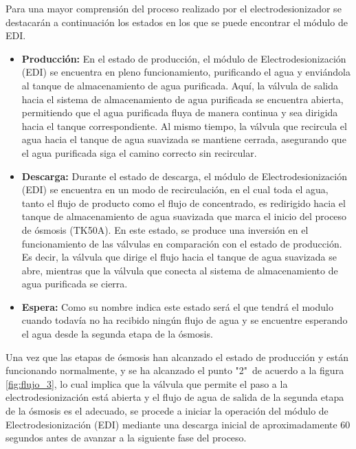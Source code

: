 
Para una mayor comprensión del proceso realizado por el electrodesionizador se destacarán a continuación
los estados en los que se puede encontrar el módulo de EDI.
\begin{itemize}
    \item \textbf{Producción: }En el estado de producción, el módulo de Electrodesionización (EDI) se encuentra en
          pleno funcionamiento, purificando el agua y enviándola al tanque de almacenamiento de agua purificada.
          Aquí, la válvula de salida hacia el sistema de almacenamiento de agua purificada se encuentra
          abierta, permitiendo que el agua purificada fluya de manera continua y sea dirigida hacia el tanque
          correspondiente. Al mismo tiempo, la válvula que recircula el agua hacia el tanque de agua suavizada se
          mantiene cerrada, asegurando que el agua purificada siga el camino correcto sin recircular.
    \item \textbf{Descarga: }Durante el estado de descarga, el módulo de Electrodesionización (EDI) se encuentra en
          un modo de recirculación, en el cual toda el agua, tanto el flujo de producto como el flujo de concentrado, es
          redirigido hacia el tanque de almacenamiento de agua suavizada que marca el inicio del proceso de ósmosis (TK50A).
          En este estado, se produce una inversión en el funcionamiento de las válvulas en comparación con el estado de producción.
          Es decir, la válvula que dirige el flujo hacia el tanque de agua suavizada se abre, mientras que la válvula que conecta al
          sistema de almacenamiento de agua purificada se cierra.
    \item \textbf{Espera: }Como su nombre indica este estado será el que tendrá el modulo cuando todavía no ha recibido ningún flujo de agua
          y se encuentre esperando el agua desde la segunda etapa de la ósmosis.
\end{itemize}
Una vez que las etapas de ósmosis han alcanzado el estado de producción y están funcionando normalmente, y
se ha alcanzado el punto "2"\ de acuerdo a la figura \ref{fig:flujo_3}, lo cual implica que la válvula que permite el paso a
la electrodesionización está abierta y el flujo de agua de salida de la segunda etapa de la ósmosis es el
adecuado, se procede a iniciar la operación del módulo de Electrodesionización (EDI) mediante una descarga
inicial de aproximadamente 60 segundos antes de avanzar a la siguiente fase del proceso.

